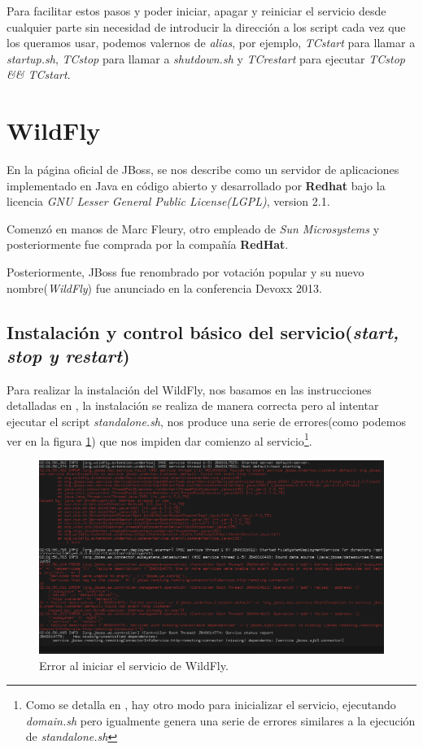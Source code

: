 \documentclass[a4paper, 10pt]{article}
\begin{document}
		Para facilitar estos pasos y poder iniciar, apagar y reiniciar el servicio desde cualquier
		parte sin necesidad de introducir la dirección a los script cada vez que los queramos usar,
		podemos valernos de \textit{alias}, por ejemplo, \textit{TCstart} para llamar a \textit{
		startup.sh}, \textit{TCstop} para llamar a \textit{shutdown.sh} y \textit{TCrestart} para
		ejecutar \textit{TCstop \&\& TCstart}.
	
\section{WildFly}
	En la página oficial de JBoss\cite{JB_official}, se nos describe como un servidor de aplicaciones
	implementado en Java en código abierto y desarrollado por \textbf{Redhat} bajo la licencia
	\textit{GNU Lesser General Public License(LGPL)}, version 2.1.
	
	Comenzó en manos de Marc Fleury, otro empleado de \textit{Sun Microsystems} y posteriormente fue
	comprada por la compañía \textbf{RedHat}.

	Posteriormente, JBoss fue renombrado por votación popular\cite{JB_vote}\cite{WF_install} y su nuevo
	nombre(\textit{WildFly}) fue anunciado en la conferencia Devoxx 2013.\cite{WF_install}\cite{WF_name}

	\subsection{Instalación y control básico del servicio(\textit{start, stop y restart})}
		Para realizar la instalación del WildFly, nos basamos en las instrucciones detalladas
		en \cite{WF_install}, la instalación se realiza de manera correcta pero al intentar
		ejecutar el script \textit{standalone.sh}, nos produce una serie de errores(como
		podemos ver en la figura \ref{fig:WF_Fail}) que nos impiden dar comienzo al
		servicio\footnote{Como se detalla en \cite{WF_install}, hay otro modo para inicializar
		el servicio, ejecutando \textit{domain.sh} pero igualmente genera una serie de errores
		similares a la ejecución de \textit{standalone.sh}}.

		\begin{figure}[h!]
			\includegraphics[width=15cm]{Fail_WF.png}
			\caption{Error al iniciar el servicio de WildFly.}
			\label{fig:WF_Fail}
		\end{figure}
\end{document}
